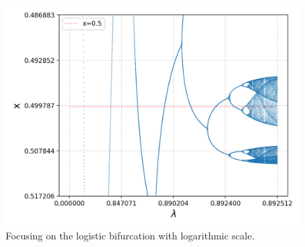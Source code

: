 \begin{figure}
	\centering
	\includegraphics[width=\textwidth]{./figures/logistic_bifurcation_log_scale.png}
	\caption{Focusing on the logistic bifurcation with logarithmic scale.}
	\label{fig:Logistic bifurcation log scaled}
\end{figure}



